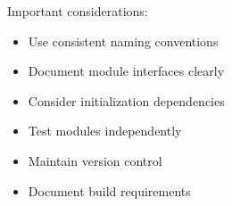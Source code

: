 \begin{remark}
Important considerations:
\begin{itemize}
  \item Use consistent naming conventions
  \item Document module interfaces clearly
  \item Consider initialization dependencies
  \item Test modules independently
  \item Maintain version control
  \item Document build requirements
\end{itemize}
\end{remark}

